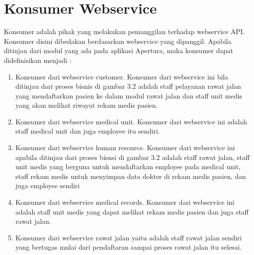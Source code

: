 \section{Konsumer Webservice}
Konsumer adalah pihak yang melakukan pemanggilan terhadap webservice
API. Konsumer disini dibedakan berdasarkan webservice yang dipanggil. Apabila
ditinjau dari modul yang ada pada aplikasi Apertura, maka konsumer dapat
didefinisikan menjadi :
\begin{enumerate}[leftmargin=*]
	\item Konsumer dari webservice customer. Konsumer dari webservice ini bila ditinjau dari proses bisnis di gambar 3.2 adalah staff pelayanan rawat jalan	yang mendaftarkan pasien ke dalam modul rawat jalan dan staff unit medis yang akan melihat riwayat rekam medis pasien.

	\item Konsumer dari webservice medical unit. Konsumer dari webservice ini adalah staff medical unit dan juga employee itu sendiri.
	\item Konsumer dari webservice human resource. Konsumer dari webservice ini	apabila ditinjau dari proses bisnsi di gambar 3.2 adalah staff rawat jalan, staff unit medis yang berguna untuk mendaftarkan employee pada medical unit, staff rekam medis untuk menyimpan data dokter di rekam medis pasien, dan juga employee sendiri
	\item Konsumer dari webservice medical records. Konsumer dari webservice ini adalah staff unit medis yang dapat melihat rekam medis pasien dan juga staff rawat jalan.
	\item Konsumer dari webservice rawat jalan yaitu adalah staff rawat jalan sendiri yang bertugas mulai dari pendaftaran sampai proses rawat jalan itu selesai.
\end{enumerate}
\newpage